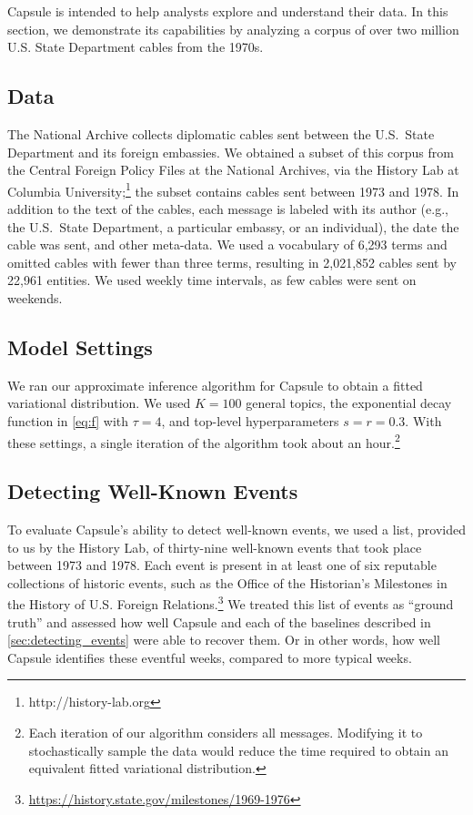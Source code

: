 Capsule is intended to help analysts explore and understand their
data. In this section, we demonstrate its capabilities by analyzing a
corpus of over two million U.S. State Department cables from the
1970s.

\subsection{Data}

The National Archive collects diplomatic cables sent between the
U.S.~State Department and its foreign embassies. We obtained a subset
of this corpus from the Central Foreign Policy Files at the National
Archives, via the History Lab at Columbia
University;\footnote{http://history-lab.org} the subset contains
cables sent between 1973 and 1978. In addition to the text
of the cables, each message is labeled with its author (e.g., the
U.S.~State Department, a particular embassy, or an individual),
the date the cable was sent, and other meta-data. We
used a vocabulary of 6,293 terms and omitted cables with fewer than
three terms, resulting in 2,021,852 cables sent by 22,961
entities. We used weekly time intervals, as few cables were sent on
weekends.

\subsection{Model Settings}

We ran our approximate inference algorithm for Capsule to obtain a
fitted variational distribution. We used $K=100$ general topics, the
exponential decay function in \cref{eq:f} with $\tau=4$, and top-level
hyperparameters $s=r=0.3$. With these settings, a single iteration of
the algorithm took about an hour.\footnote{Each iteration of our
  algorithm considers all messages. Modifying it to stochastically
  sample the data would reduce the time required to obtain an
  equivalent fitted variational distribution.}

\subsection{Detecting Well-Known Events}

To evaluate Capsule's ability to detect well-known events, we used a
list, provided to us by the History Lab, of thirty-nine well-known
events that took place between 1973 and 1978. Each event is present in
at least one of six reputable collections of historic events, such as
the Office of the Historian's Milestones in the History of
U.S. Foreign
Relations.\footnote{\url{https://history.state.gov/milestones/1969-1976}}
We treated this list of events as ``ground truth'' and assessed how
well Capsule and each of the baselines described in
\cref{sec:detecting_events} were able to recover them.  Or in other words, 
how well Capsule identifies these eventful weeks, compared to more typical weeks.

